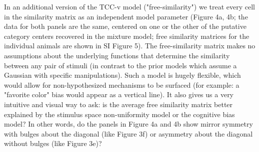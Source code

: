 \documentclass[9pt,biorxiv,lineno,onehalfspacing]{lapreprint}
\begin{document}
\begin{refsection}
In an additional version of the TCC-v model ("free-similarity") we treat every cell in the similarity matrix as an independent model parameter (Figure 4a, 4b; the data for both panels are the same, centered on one or the other of the putative category centers recovered in the mixture model; free similarity matrices for the individual animals are shown in SI Figure 5). 
The free-similarity matrix makes no assumptions about the underlying functions that determine the similarity between any pair of stimuli (in contrast to the prior models which assume a Gaussian with specific manipulations). 
Such a model is hugely flexible, which would allow for non-hypothesized mechanisms to be surfaced (for example: a "favorite color" bias would appear as a vertical line).
It also gives us a very intuitive and visual way to ask: is the average free similarity matrix better explained by the stimulus space non-uniformity model or the cognitive bias model? 
In other words, do the panels in Figure 4a and 4b show mirror symmetry with bulges about the diagonal (like Figure 3f) or asymmetry about the diagonal without bulges (like Figure 3e)? 


\end{refsection}
\end{document}
